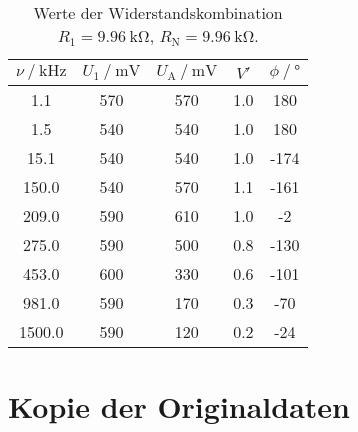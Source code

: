 \appendix

\begin{table}[h]
  \centering
  \begin{tabular}{S  S S S S}
    \toprule
    {$\nu\:/\:\si{\kilo\hertz}$}& {$U_1\:/\:\si{\milli\volt}$}& {$U_\text{A}\:/\:\si{\milli\volt}$}&{$V'$}& {$\phi\:/\:\si{\degree}$}\\
     & 570 & 570 & 1.0 & 180\\
    1.5 & 540 & 540 & 1.0 & 180\\
    15.1 & 540 & 540 & 1.0 & -174\\
    150.0 & 540 & 570 & 1.1 & -161\\
    209.0 & 590 & 610 & 1.0 & -2\\
    275.0 & 590 & 500 & 0.8 & -130\\
    453.0 & 600 & 330 & 0.6 & -101\\
    981.0 & 590 & 170 & 0.3 & -70\\
    1500.0 & 590 & 120 & 0.2 & -24\\
    \bottomrule
  \end{tabular}
  \caption{Werte der Widerstandskombination $R_1 = \SI{9.96}{\kilo\ohm}$, $R_\text{N} = \SI{9.96}{\kilo\ohm}$.}
  \label{tab:gegen_kombi_1}
\end{table}

\section{Kopie der Originaldaten}
